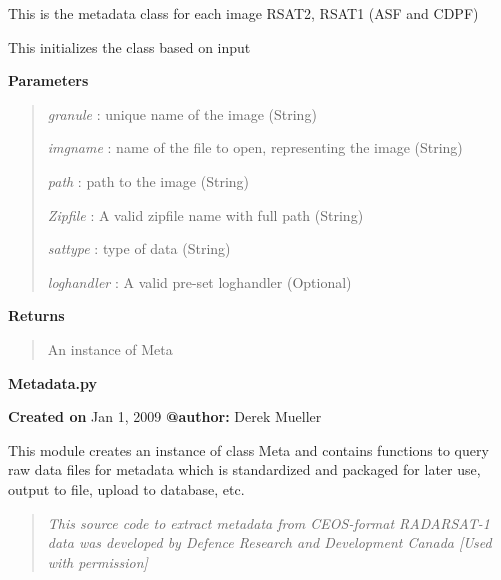 \documentclass[letterpaper,10pt,openany,oneside]{sphinxmanual}
\begin{document}
\begin{fulllineitems}
\label{code:SigLib.Metadata}
This is the metadata class for each image RSAT2, RSAT1 (ASF and CDPF)

\begin{fulllineitems}
\label{code:SigLib.Metadata.__init__}
This initializes the class based on input

\textbf{Parameters}
\begin{quote}

\emph{granule}    : unique name of the image (String)

\emph{imgname}    : name of the file to open, representing the image (String)

\emph{path}       : path to the image (String)

\emph{Zipfile}    : A valid zipfile name with full path (String)

\emph{sattype}    : type of data (String)

\emph{loghandler} : A valid pre-set loghandler (Optional)
\end{quote}

\textbf{Returns}
\begin{quote}

An instance of Meta
\end{quote}

\end{fulllineitems}


\end{fulllineitems}

\label{code:module-Metadata}
\textbf{Metadata.py}

\textbf{Created on} Jan 1, 2009 \textbf{@author:} Derek Mueller

This module creates an instance of class Meta and contains functions to
query raw data files for metadata which is standardized and packaged for
later use, output to file, upload to database, etc.
\begin{quote}

\emph{This source code to extract metadata from CEOS-format RADARSAT-1 
data was developed by Defence Research and Development Canada
{[}Used with permission{]}}
\end{quote}
\end{document}
